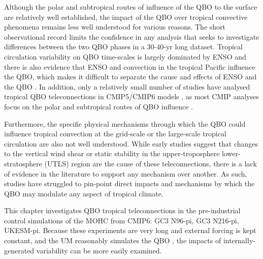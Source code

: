  Although the polar and subtropical routes of influence of the QBO to the surface are relatively well established, the impact of the QBO over tropical convective phenomena remains less well understood for various reasons. The short observational record limits the confidence in any analysis that seeks to investigate differences between the two QBO phases in a 30-40-yr long dataset. Tropical circulation variability on QBO time-scales is largely dominated by ENSO and there is also evidence that ENSO and convection in the tropical Pacific influence the QBO, which makes it difficult to separate the cause and effects of ENSO and the QBO \citep{schirber2015,christiansen2016,gray2018}. In addition,  only a relatively small number of studies have analysed tropical QBO teleconnections in CMIP5/CMIP6 models \citep{serva2021}, as most CMIP analyses focus on the polar and subtropical routes of QBO influence \citep{richter2020,anstey2021}. 
 
 
 
Furthermore, the specific physical mechanisms through which the QBO could influence tropical convection at the grid-scale or the large-scale tropical circulation are also not well understood. 
While early studies \citep{gray1984,collimore2003} suggest that changes to the vertical wind shear or static stability in the upper-troposphere lower-stratosphere (UTLS) region are the cause of these teleconnections, there is a lack of evidence in the literature to support any mechanism over another. 
As such, studies have struggled to pin-point direct impacts and mechanisms by which the QBO may modulate any aspect of tropical climate. 

This chapter investigates QBO tropical teleconnections in the pre-industrial control simulations of the MOHC from CMIP6: GC3 N96-pi, GC3 N216-pi, UKESM-pi. Because these experiments are very long and external forcing is kept constant, and the UM reasonably simulates the QBO \citep{richter2020}, the impacts of internally-generated variability can be more easily examined. 





